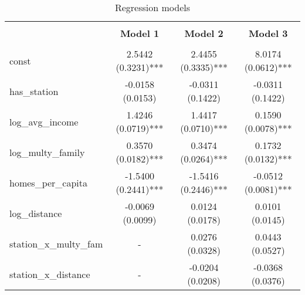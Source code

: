 
    \begin{table}
        \centering
        \caption{Regression models}
        \vspace{10pt}
        \label{tab:regression_models}
        \begin{tabular}{lccc}
        \hline
        \hline \\[-1.8ex]
     & \textbf{Model 1} & \textbf{Model 2} & \textbf{Model 3} \\
\hline \\[-1.8ex] 
const & 2.5442 (0.3231)*** & 2.4455 (0.3335)*** & 8.0174 (0.0612)*** \\
has\_station & -0.0158 (0.0153) & -0.0311 (0.1422) & -0.0311 (0.1422) \\
log\_avg\_income & 1.4246 (0.0719)*** & 1.4417 (0.0710)*** & 0.1590 (0.0078)*** \\
log\_multy\_family & 0.3570 (0.0182)*** & 0.3474 (0.0264)*** & 0.1732 (0.0132)*** \\
homes\_per\_capita & -1.5400 (0.2441)*** & -1.5416 (0.2446)*** & -0.0512 (0.0081)*** \\
log\_distance & -0.0069 (0.0099) & 0.0124 (0.0178) & 0.0101 (0.0145) \\
station\_x\_multy\_fam & - & 0.0276 (0.0328) & 0.0443 (0.0527) \\
station\_x\_distance & - & -0.0204 (0.0208) & -0.0368 (0.0376) \\

        \hline
        \hline
        \end{tabular}
    \end{table}
    